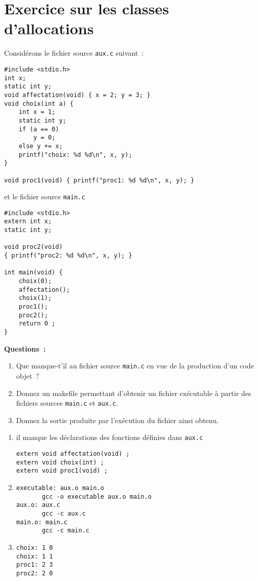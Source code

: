 \section{Exercice sur les classes d'allocations}
Consid\'erons le fichier source \verb+aux.c+ suivant~:
\begin{verbatim}
#include <stdio.h>
int x;
static int y;
void affectation(void) { x = 2; y = 3; }
void choix(int a) {
    int x = 1;
    static int y;
    if (a == 0) 
        y = 0;
    else y += x;
    printf("choix: %d %d\n", x, y);
}

void proc1(void) { printf("proc1: %d %d\n", x, y); }
\end{verbatim}
et le fichier source \verb+main.c+
\begin{verbatim}
#include <stdio.h>
extern int x;
static int y;

void proc2(void) 
{ printf("proc2: %d %d\n", x, y); }

int main(void) {
    choix(0);
    affectation();
    choix(1);
    proc1();
    proc2();
    return 0 ;
}
\end{verbatim}
\textbf{Questions~:}
\begin{enumerate}
\item Que manque-t'il au fichier source \verb?main.c? en vue de la
  production
d'un code objet~?
\item Donnez un makefile permettant d'obtenir un fichier
ex\'ecutable \`a partir des fichiers sources \verb+main.c+ et \verb+aux.c+.
\item Donnez la sortie produite par l'ex\'ecution du fichier ainsi obtenu.
\end{enumerate}
\ifcorrection
\begin{correction}
  \begin{enumerate}
  \item il manque les d\'eclarations des fonctions d\'efinies dans
    \verb+aux.c+
\begin{verbatim}
extern void affectation(void) ;
extern void choix(int) ;
extern void proc1(void) ;
\end{verbatim}
  \item
\begin{verbatim}
executable: aux.o main.o
       gcc -o executable aux.o main.o
aux.o: aux.c
       gcc -c aux.c
main.o: main.c
       gcc -c main.c
\end{verbatim}
  \item 
\begin{verbatim}
choix: 1 0
choix: 1 1
proc1: 2 3
proc2: 2 0
\end{verbatim}
  \end{enumerate}
\end{correction}
\fi
